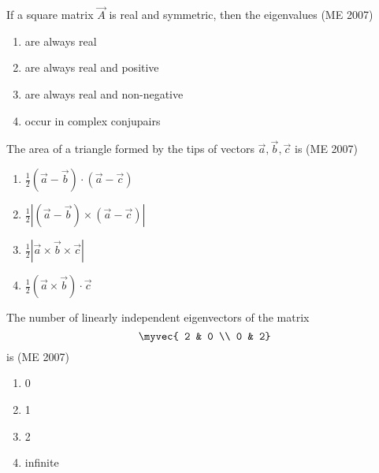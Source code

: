 \item If a square matrix $ \vec{A} $ is real and symmetric, then the eigenvalues
\hfill (ME 2007)
\begin{multicols}{2}
\begin{enumerate}
\item are always real
\item are always real and positive
\item are always real and non-negative
\item occur in complex conjupairs
\end{enumerate}
\end{multicols}

\item The area of a triangle formed by the tips of vectors $ \vec{a}, \vec{b}, \vec{c} $ is
\hfill (ME 2007)
\begin{multicols}{2}
	\begin{enumerate}[itemsep=1ex]
\item $\frac{1}{2} (\vec{a} - \vec{b}) \cdot (\vec{a} - \vec{c})$
\item $\frac{1}{2} \left| (\vec{a} - \vec{b}) \times (\vec{a} - \vec{c}) \right|$
\item $\frac{1}{2} \left| \vec{a} \times \vec{b} \times \vec{c} \right|$
\item $\frac{1}{2} (\vec{a} \times \vec{b}) \cdot \vec{c}$
\end{enumerate}
\end{multicols}
\item The number of linearly independent eigenvectors of the matrix
	$$\myvec{
2 & 0 \\
0 & 2}
$$
is
\hfill (ME 2007)
\begin{multicols}{4}
\begin{enumerate}
\item 0
\item 1
\item 2
\item infinite
\end{enumerate}
\end{multicols}

